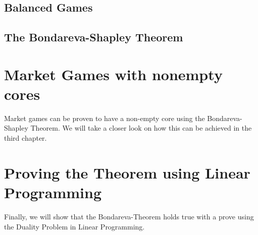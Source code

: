 \documentclass[10pt,a4paper,titlepage]{article}
\theoremstyle{plain}
\theoremstyle{definition}
\begin{document}
 \subsection{Balanced Games}

 \subsection{The Bondareva-Shapley Theorem}

 \section{Market Games with nonempty cores}
 Market games can be proven to have a non-empty core using the Bondareva-Shapley Theorem. We will take a closer look on how this can be achieved in the third chapter.

 \section{Proving the Theorem using Linear Programming}
 Finally, we will show that the Bondareva-Theorem holds true with a prove using the Duality Problem in Linear Programming.
 
\pagebreak
 


\end{document}
